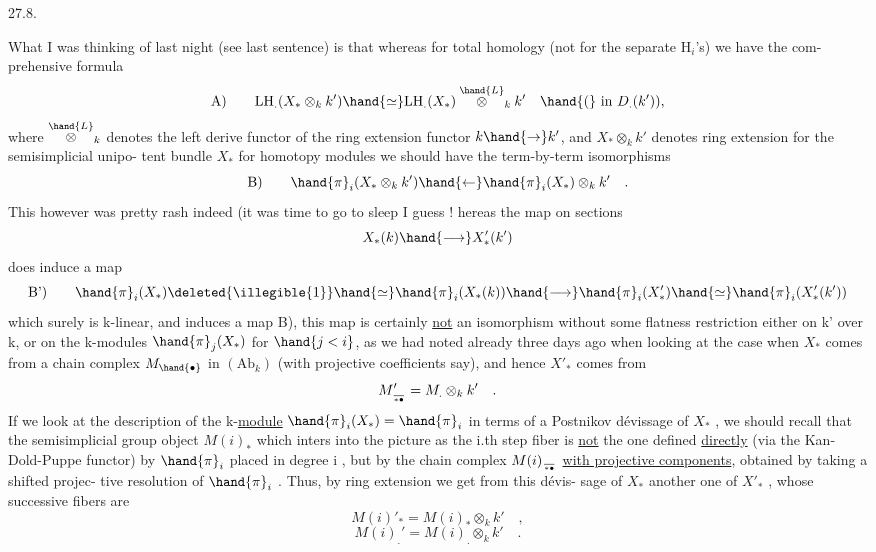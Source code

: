 
27.8.

 What I was thinking of last night (see last sentence) is that
whereas for total homology (not for the separate H$_i$'s) we have the com-%
prehensive formula
\[ \text{A)} \qquad \mathrm{LH}_{.}(X_{*}\otimes_k k')\hand{\simeq}\mathrm{LH}_{.}(X_{*}) \overset{\hand{L}}{\otimes}_k k' \quad \hand{(}\text{ in } D_{.}(k')) , \]
\hand{(}where $\overset{\hand{L}}{\otimes}_k$ denotes the left derive functor of the ring extension functor
 $k\hand{\to} k'$, and  $X_{*}\otimes_k k'$ denotes ring extension for the semisimplicial unipo-%
tent bundle $X_{*}$\hand{,)} for homotopy modules we should have the term-by-term
isomorphisms
\[ \text{B)} \qquad \hand{\pi}_i(X_{*}\otimes_k k')\hand{\leftarrow}\hand{\pi}_i(X_{*})\otimes_k k' \quad . \]
\margin{\textcircled{$\leftarrow$}}
This however was pretty rash indeed (it was time to go to sleep I guess !\hand{)}
 hereas the map on sections
\[ X_{*}(k)\hand{\longrightarrow} X'_{*}(k') \]
does induce a map
\[ \text{B')} \qquad \hand{\pi}_i(X_{*})\deleted{\illegible{1}}\hand{\simeq}\hand{\pi}_i(X_{*}(k)) \hand{\longrightarrow} \hand{\pi}_i(X'_{*})\hand{\simeq}\hand{\pi}_i(X'_{*}(k')) \]
which surely is k-linear, and  induces a map B), this map is certainly
\uline{not} an isomorphism without some flatness restriction either on k' over k,
or on the k-modules $\hand{\pi}_j(X_{*})$ for $\hand{j<i}$, as we had noted already three days
ago when looking at the case when $X_{*}$ comes from a chain complex $M_{\hand{\bullet}}$ in
$(\mathrm{Ab}_k)$ (with projective coefficients say), and hence $X'_{*}$ comes from
\[ M_{\over{*}{\bullet}}' = M_{.}\otimes_k k' \quad . \]
If we look at the description of the k-\uline{module} $\hand{\pi}_i(X_{*}) = \hand{\pi}_i$ in terms of a
Postnikov dévissage of $X_{*}$ , we should recall that the 
semisimplicial group object $M(i)_{*}$ which inters into the picture as the
i.th step fiber is \uline{not} the one defined \uline{directly} (via the Kan-Dold-Puppe
functor) by $\hand{\pi}_i$ placed in degree i , but  by the chain complex 
$M(i)_{\over{*}{\bullet}}$ \uline{with projective components}, obtained by taking  a shifted projec-%
tive resolution of $\hand{\pi}_i$ . Thus, by ring extension we get from this dévis-%
sage of $X_{*}$ another one of $X'_{*}$ , whose successive fibers are
\[ M(i)'_{*} = M(i)_{*}\otimes_k k' \quad , \]
\[ M(i)_{.}' = M(i)_{.}\otimes_k k' \quad . \]


